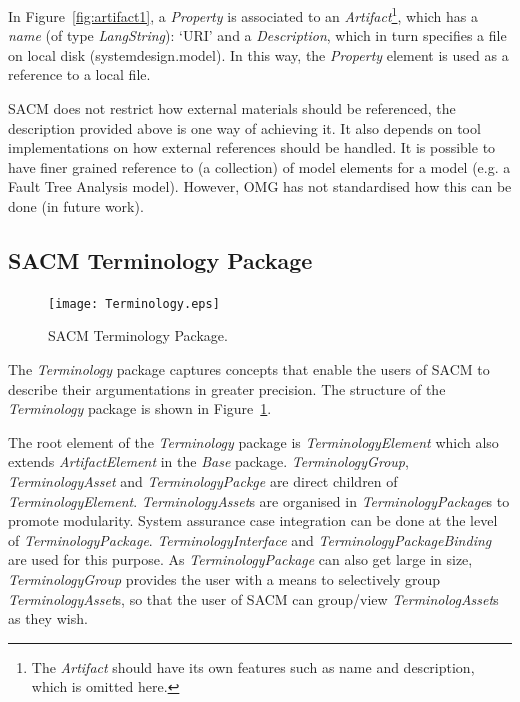 In Figure~\ref{fig:artifact1}, a \textit{Property} is associated to an \textit{Artifact}\footnote{The \textit{Artifact} should have its own features such as name and description, which is omitted here.}, which has a \textit{name} (of type \textit{LangString}): `URI' and a \textit{Description}, which in turn specifies a file on local disk (systemdesign.model). 
In this way, the \textit{Property} element is used as a reference to a local file. 

SACM does not restrict how external materials should be referenced, the description provided above is one way of achieving it. 
It also depends on tool implementations on how external references should be handled. 
It is possible to have finer grained reference to (a collection) of model elements for a model (e.g. a Fault Tree Analysis model). 
However, OMG has not standardised how this can be done (in future work).

\subsection{SACM Terminology Package}
\label{sec:termPack}

\begin{figure}[ht!]
	\centering
	\texttt{[image: Terminology.eps]}
	\caption{SACM Terminology Package.}
	\label{fig:term}
\end{figure}
The \textit{Terminology} package captures concepts that enable the users of SACM to describe their argumentations in greater precision. 
The structure of the \textit{Terminology} package is shown in Figure~\ref{fig:term}.

The root element of the \textit{Terminology} package is \textit{TerminologyElement} which also extends \textit{ArtifactElement} in the \textit{Base} package. 
\textit{TerminologyGroup}, \textit{TerminologyAsset} and \textit{TerminologyPackge} are direct children of \textit{TerminologyElement}. 
\textit{TerminologyAsset}s are organised in \textit{TerminologyPackage}s to promote modularity. System assurance case integration can be done at the level of \textit{TerminologyPackage}. 
\textit{TerminologyInterface} and \textit{TerminologyPackageBinding} are used for this purpose. 
As \textit{TerminologyPackage} can also get large in size, \textit{TerminologyGroup} provides the user with a means to selectively group \textit{TerminologyAsset}s, so that the user of SACM can group/view \textit{TerminologAsset}s as they wish.

